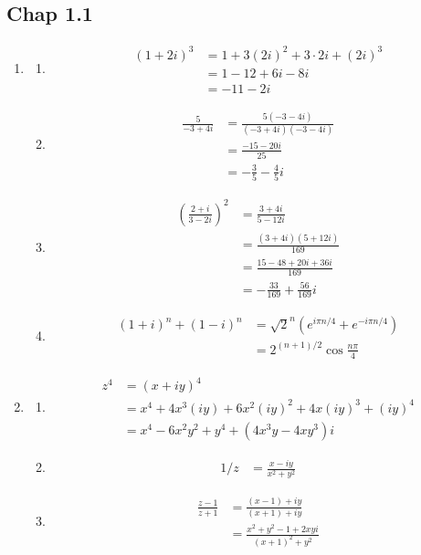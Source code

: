 \documentclass[10pt,a4paper]{book}
\theoremstyle{definition}
\begin{document}
\subsection{Chap 1.1}
\begin{enumerate}
\item
\begin{enumerate}
\item\begin{align}
(1+2i)^3
&=1+3(2i)^2+3\cdot2i+(2i)^3\\
&=1-12+6i-8i\\
&=-11-2i
\end{align}

\item\begin{align}
\frac{5}{-3+4i}
&=\frac{5(-3-4i)}{(-3+4i)(-3-4i)}\\
&=\frac{-15-20i}{25}\\
&=-\frac{3}{5}-\frac{4}{5}i
\end{align}

\item\begin{align}
\left(\frac{2+i}{3-2i}\right)^2
&=\frac{3+4i}{5-12i}\\
&=\frac{(3+4i)(5+12i)}{169}\\
&=\frac{15-48+20i+36i}{169}\\
&=-\frac{33}{169}+\frac{56}{169}i
\end{align}

\item\begin{align}
(1+i)^n+(1-i)^n
&=\sqrt{2}^n\left(e^{i\pi n/4}+e^{-i\pi n/4}\right)\\
&=2^{(n+1)/2}\cos\frac{n\pi}{4}
\end{align}
\end{enumerate}

\item
\begin{enumerate}
\item
\begin{align}
z^4
&=(x+iy)^4\\
&=x^4+4x^3(iy)+6x^2(iy)^2+4x(iy)^3+(iy)^4\\
&=x^4-6x^2y^2+y^4+(4x^3y-4xy^3)i
\end{align}

\item\begin{align}
1/z
&=\frac{x-iy}{x^2+y^2}
\end{align}

\item\begin{align}
\frac{z-1}{z+1}
&=\frac{(x-1)+iy}{(x+1)+iy}\\
&=\frac{x^2+y^2-1+2xyi}{(x+1)^2+y^2}
\end{align}


\end{enumerate}
\end{enumerate}
\end{document}
